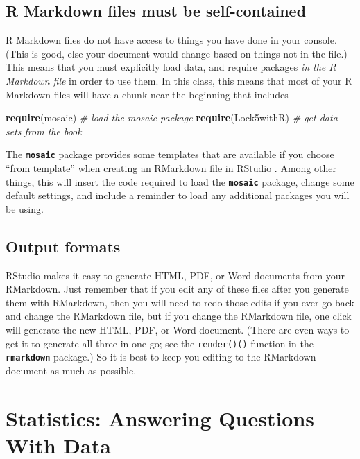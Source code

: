 \documentclass[]{book}
\newenvironment{Shaded}{\begin{snugshade}}{\end{snugshade}}
\newcommand{\CommentTok}[1]{\textcolor[rgb]{0.56,0.35,0.01}{\textit{#1}}}
\newcommand{\KeywordTok}[1]{\textcolor[rgb]{0.13,0.29,0.53}{\textbf{#1}}}
\newcommand{\NormalTok}[1]{#1}
\begin{document}
\hypertarget{r-markdown-files-must-be-self-contained}{%
\subsection{R Markdown files must be self-contained}\label{r-markdown-files-must-be-self-contained}}

R Markdown files do not have access to things you have done in your console. (This is good, else your document would change based on things not in the file.) This means that you must explicitly load data, and require packages \emph{in the R Markdown file} in order to use them. In this class, this means that most of your R Markdown files will have a chunk near the beginning that includes

\begin{Shaded}
\begin{Highlighting}[]
\KeywordTok{require}\NormalTok{(mosaic)        }\CommentTok{# load the mosaic package}
\KeywordTok{require}\NormalTok{(Lock5withR)    }\CommentTok{# get data sets from the book}
\end{Highlighting}
\end{Shaded}

The \textbf{\texttt{mosaic}} package provides some templates that are available if you choose ``from template'' when creating an RMarkdown file in RStudio .
Among other things, this will insert the code required to load the \textbf{\texttt{mosaic}} package, change some default settings, and include a reminder to
load any additional packages you will be using.

\hypertarget{output-formats}{%
\subsection{Output formats}\label{output-formats}}

RStudio makes it easy to generate HTML, PDF, or Word documents from your RMarkdown. Just remember that if you edit any of these files after you generate them
with RMarkdown, then you will need to redo those edits if you ever go back and change the RMarkdown file, but if you change the RMarkdown file, one click will
generate the new HTML, PDF, or Word document. (There are even ways to get it to generate all three in one go;
see the \texttt{render()()} function in the \textbf{\texttt{rmarkdown}} package.) So it is best to keep you editing to the RMarkdown document as much as possible.

\hypertarget{statistics-answering-questions-with-data}{%
\section{Statistics: Answering Questions With Data}\label{statistics-answering-questions-with-data}}
\end{document}
